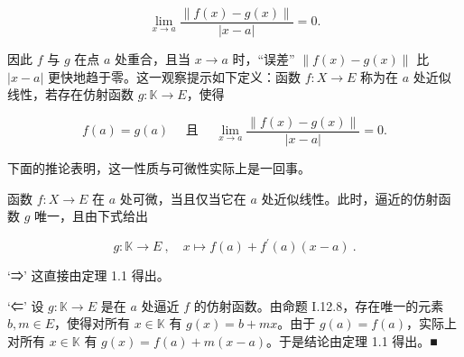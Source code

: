 \[
\lim_{x\to a}\frac{\|f(x)-g(x)\|}{|x-a|}=0.
\]

因此 $f$ 与 $g$ 在点 $a$ 处重合，且当 $x \to a$ 时，“误差” $\|f(x) - g(x)\|$ 比 $|x - a|$ 更快地趋于零。这一观察提示如下定义：函数 $f: X \to E$ 称为在 $a$ 处近似线性，若存在仿射函数 $g: \mathbb{K} \to E$，使得

\[
f(a)=g(a)\quad\text{ 且 }\quad\lim_{x\to a}\frac{\|f(x)-g(x)\|}{|x-a|}=0.
\]

下面的推论表明，这一性质与可微性实际上是一回事。

\begin{corollary}

函数 $f: X \to E$ 在 $a$ 处可微，当且仅当它在 $a$ 处近似线性。此时，逼近的仿射函数 $g$ 唯一，且由下式给出

\[
g\colon\mathbb{K}\to E~,\quad x\mapsto f(a)+f^{\prime}(a)(x-a)~.
\]

\proofhead
‘⇒’ 这直接由定理 1.1 得出。

‘⇐’ 设 $ g: \mathbb{K} \to E $ 是在 $ a $ 处逼近 $ f $ 的仿射函数。由命题 I.12.8，存在唯一的元素 $ b, m \in E $，使得对所有 $ x \in \mathbb{K} $ 有 $ g(x) = b + mx $。由于 $ g(a) = f(a) $，实际上对所有 $ x \in \mathbb{K} $ 有 $ g(x) = f(a) + m(x - a) $。于是结论由定理 1.1 得出。■
\end{corollary}

